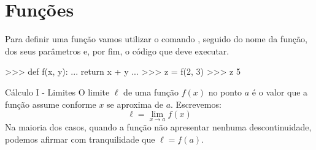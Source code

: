 	\section*{Funções}%
	Para definir uma função vamos utilizar o comando , seguido do nome da função, dos seus parâmetros e, por fim, o código que deve executar.
	\begin{lstpython}
	>>> def f(x, y):
	...		return x + y
	...
	>>> z = f(2, 3)
	>>> z
	5
	\end{lstpython}

    \begin{problem}[p:calculo:1]{Cálculo I - Limites}
	O limite $\ell$ de uma função $f(x)$ no ponto $a$ é o valor que a função assume conforme $x$ se aproxima de $a$. Escrevemos:
		$$\ell = \lim_{x \to a} f(x)$$
	Na maioria dos casos, quando a função não apresentar nenhuma descontinuidade, podemos afirmar com tranquilidade que $\ell = f(a)$. 
	\end{problem}

